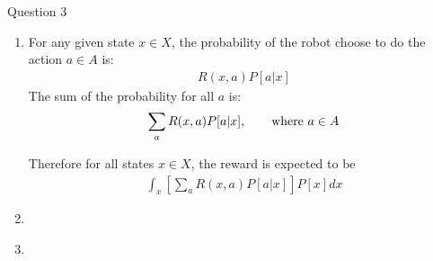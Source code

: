 \documentclass[fleqn]{article}
\begin{document}
Question 3
\begin{enumerate}[label={(\roman*)}]
\item
    \textnormal{For any given state $x \in X$, the probability of the robot choose to do the action $a \in A$ is: }
    \begin{align}
    R(x,a)P[a \vert x]
    \end{align}
    \textnormal{The sum of the probability for all $a$ is:}
    \begin{align}
        \sum_a R(x,a)P[a \vert x], \qquad \textnormal{where } a \in A
    \end{align}
    
    \textnormal{Therefore for all states $x \in X$, the reward is expected to be}
    \begin{align}
        \int_x \left[ \sum_a R(x,a)P[a \vert x] \right] P[x] dx
    \end{align}
\item
    \textnormal{}
\item
  
\end{enumerate}
\end{document}
